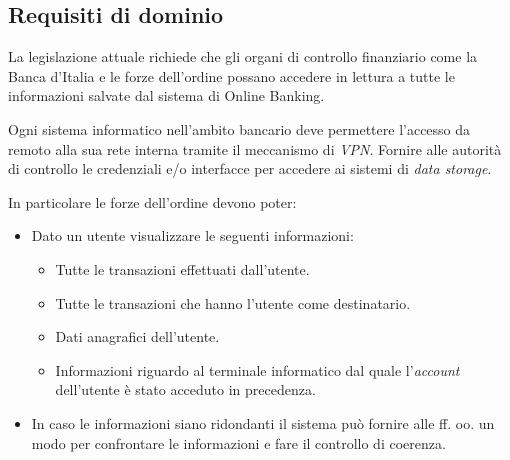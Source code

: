 \subsection{Requisiti di dominio}

La legislazione attuale richiede che gli organi di controllo finanziario come la Banca d'Italia e le forze dell'ordine possano accedere in lettura a tutte le informazioni salvate dal sistema di Online Banking.

Ogni sistema informatico nell'ambito bancario deve permettere l'accesso da remoto alla sua rete interna tramite il meccanismo di \emph{VPN}.
Fornire alle autorit\`a di controllo le credenziali e/o interfacce per accedere ai sistemi di \emph{data storage}.

In particolare le forze dell'ordine devono poter:
\begin{itemize}
    \item Dato un utente visualizzare le seguenti informazioni:
        \begin{itemize}
            \item Tutte le transazioni effettuati dall'utente.
            \item Tutte le transazioni che hanno l'utente come destinatario.
            \item Dati anagrafici dell'utente.
            \item Informazioni riguardo al terminale informatico dal quale l'\emph{account} dell'utente \`e stato acceduto in precedenza.
        \end{itemize}
    \item In caso le informazioni siano ridondanti il sistema pu\`o fornire alle ff. oo. un modo per confrontare le informazioni e fare il controllo di coerenza.
\end{itemize}

